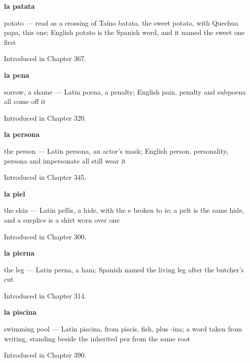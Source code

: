 \noindent\begin{minipage}[t]{\linewidth}
\raggedright
\textbf{la patata}\par
\small potato — read as a crossing of Taíno batata, the sweet potato, with Quechua papa, this one; English potato is the Spanish word, and it named the sweet one first\par
\footnotesize Introduced in Chapter 367.
\end{minipage}\par\medskip

\noindent\begin{minipage}[t]{\linewidth}
\raggedright
\textbf{la pena}\par
\small sorrow, a shame — Latin poena, a penalty; English pain, penalty and subpoena all come off it\par
\footnotesize Introduced in Chapter 320.
\end{minipage}\par\medskip

\noindent\begin{minipage}[t]{\linewidth}
\raggedright
\textbf{la persona}\par
\small the person — Latin persona, an actor's mask; English person, personality, persona and impersonate all still wear it\par
\footnotesize Introduced in Chapter 345.
\end{minipage}\par\medskip

\noindent\begin{minipage}[t]{\linewidth}
\raggedright
\textbf{la piel}\par
\small the skin — Latin pellis, a hide, with the e broken to ie; a pelt is the same hide, and a surplice is a shirt worn over one\par
\footnotesize Introduced in Chapter 300.
\end{minipage}\par\medskip

\noindent\begin{minipage}[t]{\linewidth}
\raggedright
\textbf{la pierna}\par
\small the leg — Latin perna, a ham; Spanish named the living leg after the butcher's cut\par
\footnotesize Introduced in Chapter 314.
\end{minipage}\par\medskip

\noindent\begin{minipage}[t]{\linewidth}
\raggedright
\textbf{la piscina}\par
\small swimming pool — Latin piscīna, from piscis, fish, plus -īna; a word taken from writing, standing beside the inherited pez from the same root\par
\footnotesize Introduced in Chapter 390.
\end{minipage}\par\medskip


